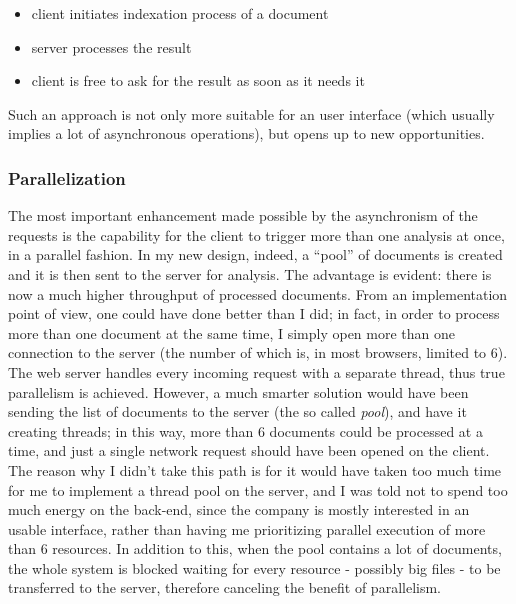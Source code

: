 \documentclass[12pt,svgnames]{memoir}
\begin{document}
\begin{itemize}
\itemsep1pt\parskip0pt
\item
  client initiates indexation process of a document
\item
  server processes the result
\item
  client is free to ask for the result as soon as it needs it
\end{itemize}

Such an approach is not only more suitable for an user interface (which
usually implies a lot of asynchronous operations), but opens up to new
opportunities.

\subsubsection*{Parallelization}\label{parallelization}

The most important enhancement made possible by the asynchronism of the
requests is the capability for the client to trigger more than one
analysis at once, in a parallel fashion. In my new design, indeed, a
``pool'' of documents is created and it is then sent to the server for
analysis. The advantage is evident: there is now a much higher
throughput of processed documents. From an implementation point of view,
one could have done better than I did; in fact, in order to process more
than one document at the same time, I simply open more than one
connection to the server (the number of which is, in most browsers,
limited to 6). The web server handles every incoming request with a
separate thread, thus true parallelism is achieved. However, a much
smarter solution would have been sending the list of documents to the
server (the so called \emph{pool}), and have it creating threads; in
this way, more than 6 documents could be processed at a time, and just a
single network request should have been opened on the client. The reason
why I didn't take this path is for it would have taken too much time for
me to implement a thread pool on the server, and I was told not to spend
too much energy on the back-end, since the company is mostly interested
in an usable interface, rather than having me prioritizing parallel
execution of more than 6 resources. In addition to this, when the pool
contains a lot of documents, the whole system is blocked waiting for
every resource - possibly big files - to be transferred to the server,
therefore canceling the benefit of parallelism.
\end{document}
